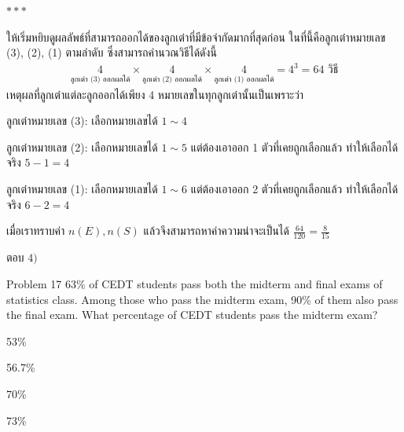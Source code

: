 \documentclass[11pt]{scrartcl}
\begin{document}
\begin{solutionbox}
  \noindent\dotfill\quad$ *** $\quad\dotfill

  \underline{}
  ให้เริ่มหยิบดูผลลัพธ์ที่สามารถออกได้ของลูกเต๋าที่มีข้อจำกัดมากที่สุดก่อน ในที่นี้คือลูกเต๋าหมายเลข (3), (2), (1) ตามลำดับ ซึ่งสามารถคำนวณวิธีได้ดังนี้
  \vspace{-5pt}
  \begin{align*}
    \underset{\text{ลูกเต๋า (3) ออกผลได้}}{4} \times 
    \underset{\text{ลูกเต๋า (2) ออกผลได้}}{4} \times 
    \underset{\text{ลูกเต๋า (1) ออกผลได้}}{4}
    = 4^3 = 64 \text{ วิธี}
  \end{align*}
  \vspace{-5pt}
  เหตุผลที่ลูกเต๋าแต่ละลูกออกได้เพียง 4 หมายเลขในทุกลูกเต๋านั้นเป็นเพราะว่า
  \begin{substmt}
    \item ลูกเต๋าหมายเลข (3): เลือกหมายเลขได้ $1 \sim 4$
    \item ลูกเต๋าหมายเลข (2): เลือกหมายเลขได้ $1 \sim 5$ แต่ต้องเอาออก 1 ตัวที่เคยถูกเลือกแล้ว ทำให้เลือกได้จริง $5-1=4$
    \item ลูกเต๋าหมายเลข (1): เลือกหมายเลขได้ $1 \sim 6$ แต่ต้องเอาออก 2 ตัวที่เคยถูกเลือกแล้ว ทำให้เลือกได้จริง $6-2=4$
  \end{substmt}

  เมื่อเราทราบค่า $n(E), n(S)$ แล้วจึงสามารถหาค่าความน่าจะเป็นได้ $\frac{64}{120} = \frac{8}{15}$

  ตอบ $\boxed{4)}$
\end{solutionbox}


\begin{problembox}{Problem 17}
  63\% of CEDT students pass both the midterm and final exams of statistics class. Among those who pass the midterm exam, 90\% of them also pass the final exam. What percentage of CEDT students pass the midterm exam?
  
  \begin{choices}
  \item 53\%
  \item 56.7\%
  \item 70\%
  \item 73\%
  \end{choices}
\end{problembox}
\end{document}

